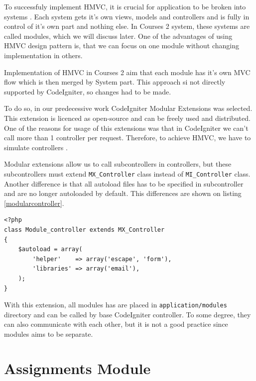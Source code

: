 

To successfuly implement HMVC, it is crucial for application to be broken into systems \cite{hmvc}. Each system gets it's own views, models and controllers and is fully in control of it's own part and nothing else. In Courses 2 system, these systems are called modules, which we will discuss later. One of the advantages of using HMVC design pattern is, that we can focus on one module without changing implementation in others.


Implementation of HMVC in Courses 2 aim that each module has it's own MVC flow which is then merged by System part. This approach si not directly supported by CodeIgniter, so changes had to be made.


To do so, in our predecessive work CodeIgniter Modular Extensions \cite{modularextensions} was selected. This extension is licenced as open-source and can be freely used and distributed. One of the reasons for usage of this extensions was that in CodeIgniter we can’t call more than 1 controller per request. Therefore, to achieve HMVC, we have to simulate controllers \cite{modularextensions}. 


Modular extensions allow us to call subcontrollers in controllers, but these subcontrollers must extend \texttt{MX\_Controller} class instead of \texttt{MI\_Controller} class. Another difference is that all autoload files has to  be specified in subcontroller and are no longer autoloaded by default. This differences are shown on listing \ref{modularcontroller}.

\begin{lstlisting}[label={modularcontroller}, caption={Module controller}]
<?php     
class Module_controller extends MX_Controller 
{
    $autoload = array(
        'helper'    => array('escape', 'form'),
        'libraries' => array('email'),
    );
}
\end{lstlisting}


With this extension, all modules has are placed in \texttt{application/modules} directory and can be called by base CodeIgniter controller. To some degree, they can also communicate with each other, but it is not a good practice since modules aims to be separate.

\section{Assignments Module}

